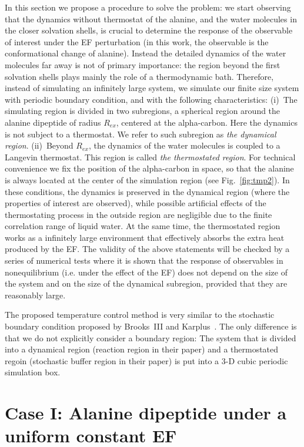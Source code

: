 \documentclass[a4paper,preprint,unsortedaddress,onecolumn]{revtex4-1}
\newcommand{\recheck}[1]{{\color{red} #1}}
\begin{document}
In this section we propose a procedure to solve the problem: we
start observing that the dynamics without thermostat of the alanine, 
and the water molecules in the closer solvation shells, is
crucial to determine the response of the observable of interest
under the EF perturbation
(in this work, the observable is the conformational change of alanine).
Instead the detailed dynamics of
the water molecules far away is not of primary importance: the region beyond the first solvation shells plays mainly the role of a thermodynamic bath. 
Therefore, instead of simulating an infinitely
large system, we simulate our finite size system with periodic
boundary condition, and with the following characteristics:
(i)~The simulating region is divided in two
subregions, a spherical region around the alanine dipeptide of radius $R_{ex}$,
centered at the alpha-carbon. Here the dynamics is
not subject to a thermostat.
We refer to such subregion as \emph{the  dynamical
region}. (ii)~Beyond $R_{ex}$, the dynamics of the water molecules is coupled
to a Langevin thermostat.  This region is called \emph{the thermostated
region}. For technical convenience we
fix the position of the alpha-carbon in space, so that the alanine is always
located at the center of the simulation region (see Fig.~\ref{fig:tmp2}).
In these conditions, the  dynamics is preserved in the dynamical region (where the properties of interest are observed), while 
possible artificial effects of the thermostating process in the outside region
are negligible due to the finite correlation
range of liquid water.
At the same time, the thermostated region works as a infinitely large
environment that effectively absorbs the extra heat produced by the EF.
The validity of the above
statements will be checked by a series of numerical tests where it is shown that
the response of observables in nonequilibrium (i.e. under the effect of the EF) does not depend on the size of the system
and on the size of the  dynamical subregion, provided that they are
reasonably large.

\recheck{ The proposed temperature control method is very similar to
  the stochastic boundary condition proposed by Brooks~III and Karplus~\cite{brooks1983deformable}.
  The only difference is that we do not explicitly consider a boundary
  region: The system that is divided into a dynamical region (reaction region in their paper) and
  a thermostated regoin (stochastic buffer region in their paper)
  is put into a 3-D cubic periodic simulation box.
} 

\section{Case I: Alanine dipeptide
  under a uniform  constant EF}
\end{document}
